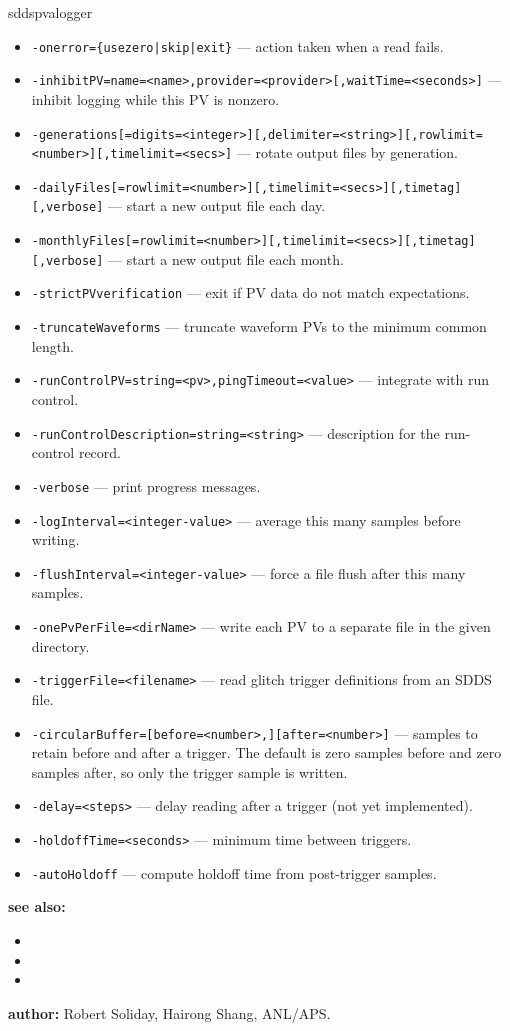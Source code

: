 \begin{sddsprog}{sddspvalogger}
\begin{itemize}
  \item {\tt -onerror=\{usezero|skip|exit\}} --- action taken when a read fails.
  \item {\tt -inhibitPV=name=<name>,provider=<provider>[,waitTime=<seconds>]} --- inhibit logging while this PV is nonzero.
  \item {\tt -generations[=digits=<integer>][,delimiter=<string>][,rowlimit=<number>][,timelimit=<secs>]} --- rotate output files by generation.
  \item {\tt -dailyFiles[=rowlimit=<number>][,timelimit=<secs>][,timetag][,verbose]} --- start a new output file each day.
  \item {\tt -monthlyFiles[=rowlimit=<number>][,timelimit=<secs>][,timetag][,verbose]} --- start a new output file each month.
  \item {\tt -strictPVverification} --- exit if PV data do not match expectations.
  \item {\tt -truncateWaveforms} --- truncate waveform PVs to the minimum common length.
  \item {\tt -runControlPV=string=<pv>,pingTimeout=<value>} --- integrate with run control.
  \item {\tt -runControlDescription=string=<string>} --- description for the run-control record.
  \item {\tt -verbose} --- print progress messages.
  \item {\tt -logInterval=<integer-value>} --- average this many samples before writing.
  \item {\tt -flushInterval=<integer-value>} --- force a file flush after this many samples.
  \item {\tt -onePvPerFile=<dirName>} --- write each PV to a separate file in the given directory.
  \item {\tt -triggerFile=<filename>} --- read glitch trigger definitions from an SDDS file.
  \item {\tt -circularBuffer=[before=<number>,][after=<number>]} --- samples to retain before and after a trigger.
  The default is zero samples before and zero samples after, so only the trigger sample is written.
  \item {\tt -delay=<steps>} --- delay reading after a trigger (not yet implemented).
  \item {\tt -holdoffTime=<seconds>} --- minimum time between triggers.
  \item {\tt -autoHoldoff} --- compute holdoff time from post-trigger samples.
\end{itemize}

\item \textbf{see also:}
\begin{itemize}
  \item {}
  \item {}
  \item {}
\end{itemize}
\item \textbf{author:} Robert Soliday, Hairong Shang, ANL/APS.
\end{sddsprog}
